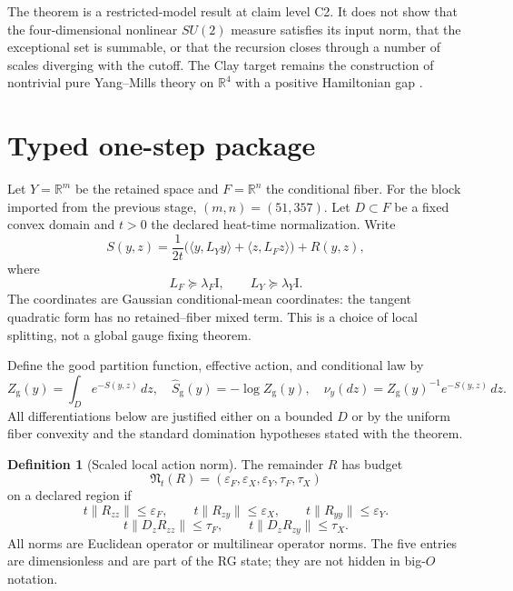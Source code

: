 \documentclass[11pt]{article}
\theoremstyle{definition}
\newtheorem{definition}[theorem]{Definition}
\newcommand{\R}{\mathbb R}
\newcommand{\Id}{\mathrm I}
\newcommand{\good}{\mathrm g}
\begin{document}
The theorem is a restricted-model result at claim level C2.  It does not show
that the four-dimensional nonlinear $SU(2)$ measure satisfies its input norm,
that the exceptional set is summable, or that the recursion closes through a
number of scales diverging with the cutoff.  The Clay target remains the
construction of nontrivial pure Yang--Mills theory on $\R^4$ with a positive
Hamiltonian gap \cite{JaffeWitten}.

\section{Typed one-step package}

Let $Y=\R^m$ be the retained space and $F=\R^n$ the conditional fiber.  For the
block imported from the previous stage, $(m,n)=(51,357)$.  Let $D\subset F$ be
a fixed convex domain and $t>0$ the declared heat-time normalization.  Write
\begin{equation}\label{eq:action}
 S(y,z)=\frac{1}{2t}\bigl(\langle y,L_Yy\rangle+
 \langle z,L_Fz\rangle\bigr)+R(y,z),
\end{equation}
where
\begin{equation}\label{eq:tangent-bounds}
 L_F\succeq\lambda_F\Id,
 \qquad L_Y\succeq\lambda_Y\Id.
\end{equation}
The coordinates are Gaussian conditional-mean coordinates: the tangent
quadratic form has no retained--fiber mixed term.  This is a choice of local
splitting, not a global gauge fixing theorem.

Define the good partition function, effective action, and conditional law by
\begin{equation}\label{eq:marginal}
 Z_{\good}(y)=\int_D e^{-S(y,z)}\,dz,
 \quad
 \widehat S_{\good}(y)=-\log Z_{\good}(y),
 \quad
 \nu_y(dz)=Z_{\good}(y)^{-1}e^{-S(y,z)}\,dz.
\end{equation}
All differentiations below are justified either on a bounded $D$ or by the
uniform fiber convexity and the standard domination hypotheses stated with the
theorem.

\begin{definition}[Scaled local action norm]\label{def:norm}
The remainder $R$ has budget
\[
 \mathfrak N_t(R)=
 (\varepsilon_F,\varepsilon_X,\varepsilon_Y,\tau_F,\tau_X)
\]
on a declared region if
\begin{equation}\label{eq:second}
 t\|R_{zz}\|\le\varepsilon_F,\qquad
 t\|R_{zy}\|\le\varepsilon_X,\qquad
 t\|R_{yy}\|\le\varepsilon_Y.
\end{equation}
\begin{equation}\label{eq:third}
 t\|D_zR_{zz}\|\le\tau_F,\qquad
 t\|D_zR_{zy}\|\le\tau_X.
\end{equation}
All norms are Euclidean operator or multilinear operator norms.  The five
entries are dimensionless and are part of the RG state; they are not hidden in
big-$O$ notation.
\end{definition}
\end{document}
